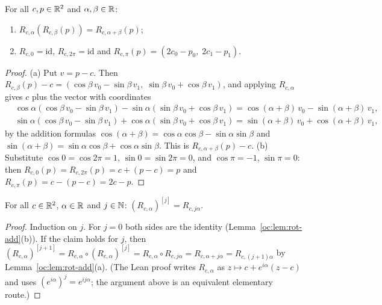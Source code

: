 \begin{lemma}\label{oc:lem:rot-add}
For all $c,p\in\mathbb R^2$ and $\alpha,\beta\in\mathbb R$:
\begin{enumerate}[label=(\alph*)]
\item $R_{c,\alpha}(R_{c,\beta}(p))=R_{c,\alpha+\beta}(p)$;
\item $R_{c,0}=\mathrm{id}$, $R_{c,2\pi}=\mathrm{id}$ and $R_{c,\pi}(p)=(2c_0-p_0,\;2c_1-p_1)$.
\end{enumerate}
\end{lemma}
\begin{proof}
(a) Put $v=p-c$. Then $R_{c,\beta}(p)-c=(\cos\beta\,v_0-\sin\beta\,v_1,\;\sin\beta\,v_0+\cos\beta\,v_1)$, and
applying $R_{c,\alpha}$ gives $c$ plus the vector with coordinates
\begin{align*}
&\cos\alpha(\cos\beta\,v_0-\sin\beta\,v_1)-\sin\alpha(\sin\beta\,v_0+\cos\beta\,v_1)
 =\cos(\alpha+\beta)\,v_0-\sin(\alpha+\beta)\,v_1,\\
&\sin\alpha(\cos\beta\,v_0-\sin\beta\,v_1)+\cos\alpha(\sin\beta\,v_0+\cos\beta\,v_1)
 =\sin(\alpha+\beta)\,v_0+\cos(\alpha+\beta)\,v_1,
\end{align*}
by the addition formulas $\cos(\alpha+\beta)=\cos\alpha\cos\beta-\sin\alpha\sin\beta$ and
$\sin(\alpha+\beta)=\sin\alpha\cos\beta+\cos\alpha\sin\beta$. This is $R_{c,\alpha+\beta}(p)-c$.
(b) Substitute $\cos0=\cos2\pi=1$, $\sin0=\sin2\pi=0$, and $\cos\pi=-1$, $\sin\pi=0$: then
$R_{c,0}(p)=R_{c,2\pi}(p)=c+(p-c)=p$ and $R_{c,\pi}(p)=c-(p-c)=2c-p$.
\end{proof}

\begin{lemma}\label{oc:lem:iterate}
For all $c\in\mathbb R^2$, $\alpha\in\mathbb R$ and $j\in\mathbb N$: $(R_{c,\alpha})^{[j]}=R_{c,j\alpha}$.
\end{lemma}
\begin{proof}
Induction on $j$. For $j=0$ both sides are the identity (Lemma~\ref{oc:lem:rot-add}(b)). If the claim
holds for $j$, then $(R_{c,\alpha})^{[j+1]}=R_{c,\alpha}\circ(R_{c,\alpha})^{[j]}=R_{c,\alpha}\circ
R_{c,j\alpha}=R_{c,\alpha+j\alpha}=R_{c,(j+1)\alpha}$ by Lemma~\ref{oc:lem:rot-add}(a). (The Lean proof
writes $R_{c,\alpha}$ as $z\mapsto c+e^{i\alpha}(z-c)$ and uses $(e^{i\alpha})^j=e^{ij\alpha}$; the
argument above is an equivalent elementary route.)
\end{proof}

